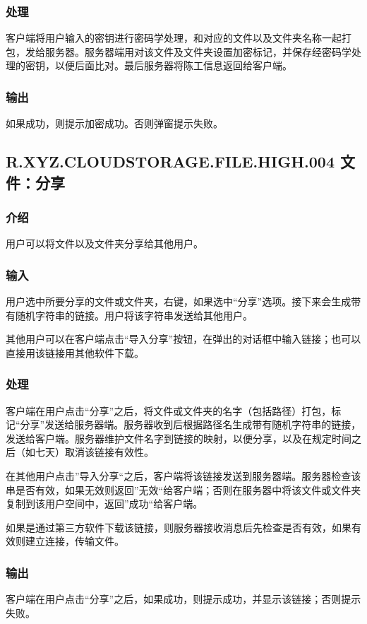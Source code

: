 \subsubsection{处理} 
客户端将用户输入的密钥进行密码学处理，和对应的文件以及文件夹名称一起打包，发给服务器。服务器端用对该文件及文件夹设置加密标记，并保存经密码学处理的密钥，以便后面比对。最后服务器将陈工信息返回给客户端。

\subsubsection{输出} 
如果成功，则提示加密成功。否则弹窗提示失败。



\subsection{R.XYZ.CLOUDSTORAGE.FILE.HIGH.004 文件：分享}

\subsubsection{介绍}
用户可以将文件以及文件夹分享给其他用户。

\subsubsection{输入} 
用户选中所要分享的文件或文件夹，右键，如果选中“分享”选项。接下来会生成带有随机字符串的链接。用户将该字符串发送给其他用户。

其他用户可以在客户端点击“导入分享”按钮，在弹出的对话框中输入链接；也可以直接用该链接用其他软件下载。

\subsubsection{处理} 
客户端在用户点击“分享”之后，将文件或文件夹的名字（包括路径）打包，标记“分享”发送给服务器端。服务器收到后根据路径名生成带有随机字符串的链接，发送给客户端。服务器维护文件名字到链接的映射，以便分享，以及在规定时间之后（如七天）取消该链接有效性。

在其他用户点击”导入分享“之后，客户端将该链接发送到服务器端。服务器检查该串是否有效，如果无效则返回”无效“给客户端；否则在服务器中将该文件或文件夹复制到该用户空间中，返回”成功“给客户端。

如果是通过第三方软件下载该链接，则服务器接收消息后先检查是否有效，如果有效则建立连接，传输文件。

\subsubsection{输出} 
客户端在用户点击“分享”之后，如果成功，则提示成功，并显示该链接；否则提示失败。
 
